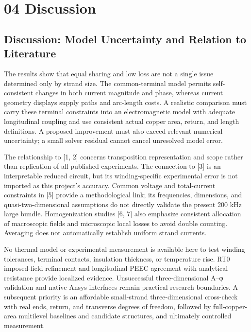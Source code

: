 \documentclass[11pt]{article}
\begin{document}
\section*{04 Discussion}
\hypertarget{chapter-04}{}
\subsection*{Discussion: Model Uncertainty and Relation to Literature}
\hypertarget{04.discussion.heading}{}
The results show that equal sharing and low loss are not a single issue determined only by strand size. The common-terminal model permits self-consistent changes in both current magnitude and phase, whereas current geometry displays supply paths and arc-length costs. A realistic comparison must carry these terminal constraints into an electromagnetic model with adequate longitudinal coupling and use consistent actual copper area, return, and length definitions. A proposed improvement must also exceed relevant numerical uncertainty; a small solver residual cannot cancel unresolved model error.


The relationship to [1, 2] concerns transposition representation and scope rather than replication of all published experiments. The connection to [3] is an interpretable reduced circuit, but its winding-specific experimental error is not imported as this project’s accuracy. Common voltage and total-current constraints in [5] provide a methodological link; its frequencies, dimensions, and quasi-two-dimensional assumptions do not directly validate the present 200 kHz large bundle. Homogenization studies [6, 7] also emphasize consistent allocation of macroscopic fields and microscopic local losses to avoid double counting. Averaging does not automatically establish uniform strand currents.


No thermal model or experimental measurement is available here to test winding tolerances, terminal contacts, insulation thickness, or temperature rise. RT0 imposed-field refinement and longitudinal PEEC agreement with analytical resistance provide localized evidence. Unsuccessful three-dimensional A–φ validation and native Ansys interfaces remain practical research boundaries. A subsequent priority is an affordable small-strand three-dimensional cross-check with real ends, return, and transverse degrees of freedom, followed by full-copper-area multilevel baselines and candidate structures, and ultimately controlled measurement.
\end{document}
